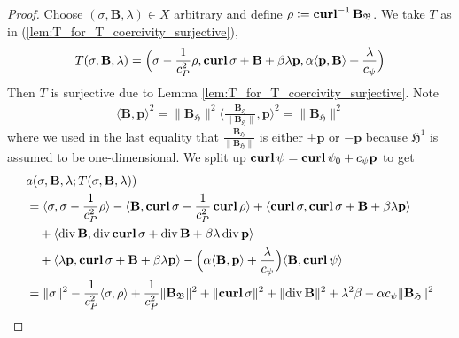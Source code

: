 \documentclass[../master_thesis.tex]{subfiles}
\begin{document}
\begin{proof}
    Choose $(\sigma, \mathbf{B},\lambda) \in X$ 
    arbitrary and define $\rho \vcentcolon= \veccurl^{-1} \mathbf{B}_{\mathfrak{B}}$.
    We take $T$ as in (\ref{lem:T_for_T_coercivity_surjective}),
    \begin{align*}
        T(\sigma, \mathbf{B},\lambda)
        = \Big(\sigma - \frac{1}{c_P^2}\rho, \veccurl \sigma + \mathbf{B} + \beta \lambda\mathbf{p},
            \alpha \langle \mathbf{p},\mathbf{B} \rangle  + \frac{\lambda}{c_\psi} \Big)
    \end{align*}
    Then $T$ is surjective due to Lemma \ref{lem:T_for_T_coercivity_surjective}. 
    Note 
    \begin{align*}
        \langle \mathbf{B}, \mathbf{p} \rangle ^ 2
        = \lVert \mathbf{B}_\mathfrak{H} \rVert^2  
            \langle \frac{\mathbf{B}_\mathfrak{H}}{\lVert \mathbf{B}_\mathfrak{H} \rVert}, \mathbf{p} \rangle ^ 2
        = \lVert \mathbf{B}_\mathfrak{H} \rVert^2
    \end{align*}
    where we used in the last equality that $\frac{\mathbf{B}_\mathfrak{H}}{\lVert \mathbf{B}_\mathfrak{H} \rVert}$
    is either $+\mathbf{p}$ or $-\mathbf{p}$ because $\mathfrak{H}^1$ is assumed to be one-dimensional.
    We split up $\veccurl\psi = \veccurl\psi_0 + c_\psi \mathbf{p}$ to get 
    \begin{align*}
        &a(\sigma, \mathbf{B},\lambda;T(\sigma, \mathbf{B},\lambda))
        \\ &=\langle \sigma, \sigma - \frac{1}{c_P^2} \rho \rangle 
            - \langle \mathbf{B}, \veccurl \sigma - \frac{1}{c_P^2}\veccurl \rho \rangle
            + \langle \veccurl \sigma , \veccurl \sigma + \mathbf{B} + \beta \lambda \mathbf{p} \rangle
        \\ &\quad + \langle \diver \mathbf{B}, \diver \veccurl \sigma 
            + \diver \mathbf{B} + \beta \lambda \diver \mathbf{p}\rangle
        \\ &\quad + \langle \lambda \mathbf{p}, \veccurl \sigma + \mathbf{B} + \beta \lambda \mathbf{p}\rangle
            - \Big(\alpha \langle \mathbf{B}, \mathbf{p} \rangle + \frac{\lambda}{c_\psi}\Big)
            \langle \mathbf{B} , \veccurl\psi \rangle
        \\ &= \lVert \sigma \rVert^2 - \frac{1}{c_P^2} \langle \sigma , \rho \rangle 
            + \frac{1}{c_P^2} \lVert \mathbf{B}_\mathfrak{B} \rVert^2 + \lVert  \veccurl \sigma \rVert^2
            + \lVert \diver \mathbf{B} \rVert ^2 + \lambda ^2 \beta - \alpha c_\psi \lVert \mathbf{B}_\mathfrak{H} \rVert^2

\end{align*}
\end{proof}
\end{document}
